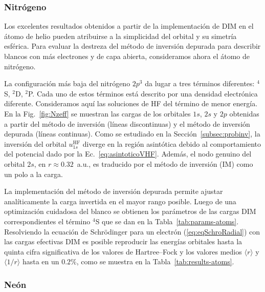 \subsubsection*{Nitrógeno}

Los excelentes resultados obtenidos a partir de la implementación de DIM 
en el átomo de helio pueden atribuirse a la simplicidad del orbital y su 
simetría esférica. Para evaluar la destreza del método de inversión 
depurada para describir blancos con más electrones y de capa abierta, 
consideramos ahora el átomo de nitrógeno. 

La configuración más baja del nitrógeno $2p^3$ da lugar a tres términos 
diferentes: $^4$S, $^2$D, $^2$P. Cada uno de estos términos está 
descrito por una densidad electrónica diferente. Consideramos aquí 
las soluciones de HF del término de menor energía. En la  
Fig.~\ref{fig:Nzeff} se muestran las cargas de los orbitales $1s$, $2s$ 
y $2p$ obtenidas a partir del método de inversión (líneas discontinuas) 
y el método de inversión depurada (líneas continuas). Como se estudiado 
en la Sección~\ref{subsec:probinv}, la inversión del orbital 
$u_{1s}^{\mathrm{HF}}$ diverge en la región asintótica debido al 
comportamiento del potencial dado por la Ec.~\ref{eq:asintoticoVHF}. 
Además, el nodo genuino del orbital $2s$, en $r\approx 0.32$~a.u., es 
traducido por el método de inversión (IM) como un polo a la carga. 

La implementación del método de inversión depurada permite ajustar 
analíticamente la carga invertida en el mayor rango posible. Luego de 
una optimización cuidadosa del blanco se obtienen los parámetros de las 
cargas DIM correspondientes el término $^4$S que se dan en la 
Tabla~\ref{tab:params-atoms}. Resolviendo la ecuación de Schr\"odinger 
para un electrón (\ref{eq:eqSchroRadial}) con las cargas efectivas DIM 
es posible reproducir las energías orbitales hasta la quinta cifra 
significativa de los valores de Hartree--Fock y los valores medios 
$\langle r \rangle$ y $\langle 1/r \rangle$ hasta en un $0.2\%$, como se 
muestra en la Tabla~\ref{tab:results-atoms}.  


\subsubsection*{Neón}

